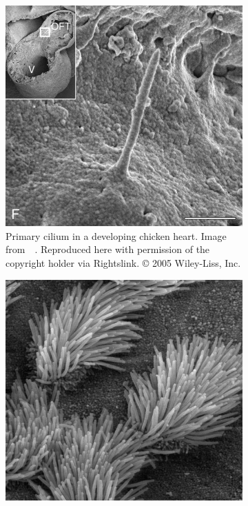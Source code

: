 \begin{figure}
    \centering%
    \begin{subfigure}[t]{0.47\linewidth}%
        \centering%
        \includegraphics[width=\textwidth]{images_other/primary_cilium.jpg}%
        \caption{Primary cilium in a developing chicken heart. Image from~\citeauthor*{van_der_heiden_monocilia_2006}~\cite{van_der_heiden_monocilia_2006}. Reproduced here with permission of the copyright holder via Rightslink. © 2005 Wiley-Liss, Inc.}%
        \label{fig:sem_primary}%
    \end{subfigure}%
    \hfill
    \begin{subfigure}[t]{0.47\linewidth}%
        \centering%
        \includegraphics[width=\textwidth]{images_other/trachea_cilia_daghlian_pd.jpg}%

\end{subfigure}
\end{figure}
